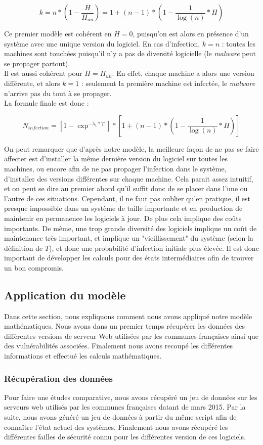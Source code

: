 \[
k=n*(1-\frac{H}{H_{un}}) = 1+(n-1)*(1-\frac{1}{\log(n)}*H)
\]

Ce premier modèle est cohérent en $H=0$, puisqu'on est alors en présence d'un système avec une unique version du logiciel. En cas d'infection, $k=n$ : toutes les machines sont touchées puisqu'il n'y a pas de diversité logicielle (le \textit{malware} peut se propager partout).\\
Il est aussi cohérent pour $H=H_{un}$. En effet, chaque machine a alors une version différente, et alors $k=1$ : seulement la première machine est infectée, le \textit{malware} n'arrive pas du tout à se propager.\\
La formule finale est donc :


\[
N_{infection}=[1-\exp^{-\lambda_1*T}] * [1+(n-1)*(1-\frac{1}{\log(n)}*H)]
\]

On peut remarquer que d'après notre modèle, la meilleure façon de ne pas se faire affecter est d'installer la même dernière version du logiciel sur toutes les machines, ou encore afin de ne pas propager l'infection dans le système, d'installer des versions différentes sur chaque machine. Cela parait assez intuitif, et on peut se dire au premier abord qu'il suffit donc de se placer dans l'une ou l'autre de ces situations. Cependant, il ne faut pas oublier qu'en pratique, il est presque impossible dans un système de taille importante et en production de maintenir en permanence les logiciels à jour. De plus cela implique des coûts importants. De même, une trop grande diversité des logiciels implique un coût de maintenance très important, et implique un "vieillissement" du système (selon la définition de $T$), et donc une probabilité d'infection initiale plus élevée. Il est donc important de développer les calculs pour des états intermédiaires afin de trouver un bon compromis.

\subsection{Application du modèle}\label{sec:simulation}
Dans cette section, nous expliquons comment nous avons appliqué notre modèle mathématiques.
Nous avons dans un premier temps récupérer les données des différentes versions de serveur Web utilisées par les communes françaises ainsi que des vulnérabilités associées.
Finalement nous avons recoupé les différentes informations et effectué les calculs mathématiques.

\subsubsection{Récupération des données}\label{sec:recupData}
Pour faire une études comparative, nous avons récupéré un jeu de données sur les serveurs web utilisés par les communes françaises datant de mars 2015.
Par la suite, nous avons généré un jeu de données à partir du même script afin de connaître l'état actuel des systèmes.
Finalement nous avons récupéré les différentes failles de sécurité connu pour les différentes version de ces logiciels.

